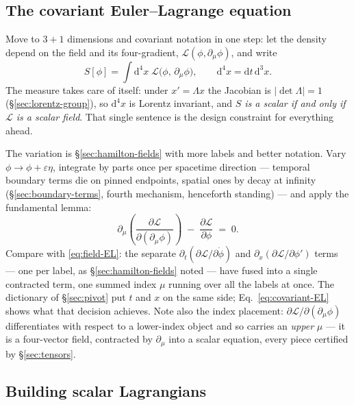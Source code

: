 \documentclass[11pt]{article}
\theoremstyle{plain}
\theoremstyle{definition}
\theoremstyle{remark}
\newcommand{\dd}{\mathrm{d}}
\newcommand{\pd}[2]{\frac{\partial #1}{\partial #2}}
\begin{document}
\subsection{The covariant Euler--Lagrange equation}
\label{sec:covariant-EL}

Move to $3{+}1$ dimensions and covariant notation in one step: let the
density depend on the field and its four-gradient,
$\mathcal L(\phi, \partial_\mu\phi)$, and write
\begin{equation}
  S[\phi] = \int \dd^4x\;
  \mathcal L\bigl(\phi,\, \partial_\mu\phi\bigr),
  \qquad \dd^4x = \dd t\,\dd^3x .
  \label{eq:covariant-action}
\end{equation}
The measure takes care of itself: under $x' = \Lambda x$ the Jacobian
is $|\det\Lambda| = 1$ (\S\ref{sec:lorentz-group}), so $\dd^4x$ is
Lorentz invariant, and \emph{$S$ is a scalar if and only if
$\mathcal L$ is a scalar field}. That single sentence is the design
constraint for everything ahead.

The variation is \S\ref{sec:hamilton-fields} with more labels and
better notation. Vary $\phi \to \phi + \varepsilon\eta$, integrate by
parts once per spacetime direction --- temporal boundary terms die on
pinned endpoints, spatial ones by decay at infinity
(\S\ref{sec:boundary-terms}, fourth mechanism, henceforth standing) ---
and apply the fundamental lemma:
\begin{equation}
  \boxed{\;
  \partial_\mu
  \left(
    \pd{\mathcal L}{(\partial_\mu\phi)}
  \right)
  \;-\;
  \pd{\mathcal L}{\phi}
  \;=\; 0 .
  \;}
  \label{eq:covariant-EL}
\end{equation}
Compare with \eqref{eq:field-EL}: the separate
$\partial_t(\partial\mathcal L/\partial\dot\phi)$ and
$\partial_x(\partial\mathcal L/\partial\phi')$ terms --- one per label,
as \S\ref{sec:hamilton-fields} noted --- have fused into a single
contracted term, one summed index $\mu$ running over all the labels at
once. The dictionary of \S\ref{sec:pivot} put $t$ and $x$ on the same
side; Eq.~\eqref{eq:covariant-EL} shows what that decision achieves. Note
also the index placement: $\partial\mathcal L/\partial(\partial_\mu\phi)$
differentiates with respect to a lower-index object and so carries an
\emph{upper} $\mu$ --- it is a four-vector field, contracted by
$\partial_\mu$ into a scalar equation, every piece certified by
\S\ref{sec:tensors}.

\subsection{Building scalar Lagrangians}
\label{sec:building-lagrangians}
\end{document}
